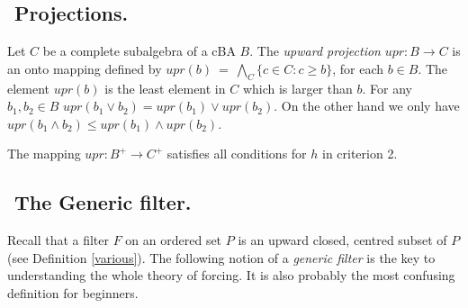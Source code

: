 %

\subsection{${}$ \hspace{-1em}Projections.} Let $C$ be a complete subalgebra
of a cBA $B$. The \emph{upward projection} $upr : B \to C$ is an onto mapping defined
by $upr(b) \ = \ \bigwedge_{C} \{c \in C : c \geq b \}$, for each $b \in B$.
The element $upr(b)$ is the least element in $C$ which is larger than $b$.
For any $b_1,b_2 \in B$ $upr(b_1 \vee b_2) = upr(b_1) \vee upr(b_2)$.
On the other hand we only have $upr(b_1 \wedge b_2) \leq upr(b_1) \wedge upr(b_2)$.

The mapping $upr : B^+ \to C^+$ satisfies all conditions for $h$ in
criterion 2.

\subsection{${}$ \hspace{-1em}The Generic filter.}

Recall that a filter $F$ on an ordered set $P$ is an upward closed, centred
subset of $P$ (see Definition \ref{various}). The following notion of
a \emph{generic filter} is the key to understanding the whole theory of
forcing. It is also probably the most confusing definition for beginners.

